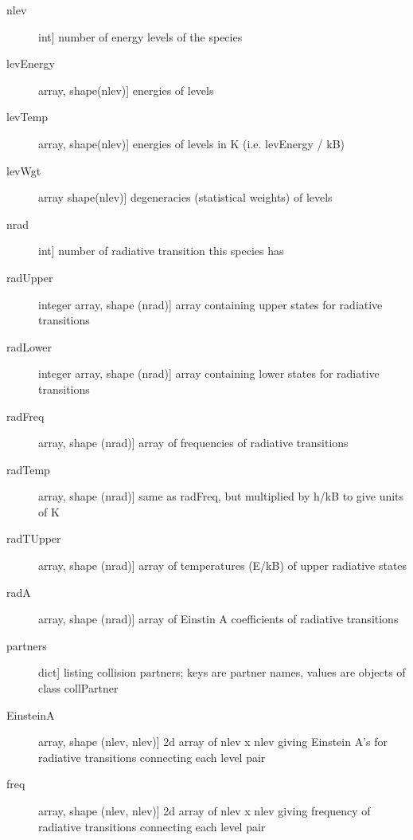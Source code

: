 \documentclass[letterpaper,10pt,english]{sphinxmanual}
\begin{document}
\begin{fulllineitems}
\begin{description}
\begin{description}
\item[{nlev}] \leavevmode{[}int{]}
number of energy levels of the species

\item[{levEnergy}] \leavevmode{[}array, shape(nlev){]}
energies of levels

\item[{levTemp}] \leavevmode{[}array, shape(nlev){]}
energies of levels in K (i.e. levEnergy / kB)

\item[{levWgt}] \leavevmode{[}array shape(nlev){]}
degeneracies (statistical weights) of levels

\item[{nrad}] \leavevmode{[}int{]}
number of radiative transition this species has

\item[{radUpper}] \leavevmode{[}integer array, shape (nrad){]}
array containing upper states for radiative transitions

\item[{radLower}] \leavevmode{[}integer array, shape (nrad){]}
array containing lower states for radiative transitions

\item[{radFreq}] \leavevmode{[}array, shape (nrad){]}
array of frequencies of radiative transitions

\item[{radTemp}] \leavevmode{[}array, shape (nrad){]}
same as radFreq, but multiplied by h/kB to give units of K

\item[{radTUpper}] \leavevmode{[}array, shape (nrad){]}
array of temperatures (E/kB) of upper radiative states

\item[{radA}] \leavevmode{[}array, shape (nrad){]}
array of Einstin A coefficients of radiative transitions

\item[{partners}] \leavevmode{[}dict{]}
listing collision partners; keys are partner names, values are
objects of class collPartner

\item[{EinsteinA}] \leavevmode{[}array, shape (nlev, nlev){]}
2d array of nlev x nlev giving Einstein A's for radiative
transitions connecting each level pair

\item[{freq}] \leavevmode{[}array, shape (nlev, nlev){]}
2d array of nlev x nlev giving frequency of radiative
transitions connecting each level pair


\end{description}
\end{description}
\end{fulllineitems}
\end{document}
